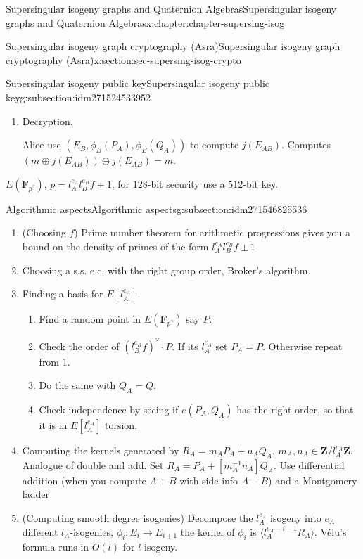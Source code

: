 \documentclass[oneside,10pt,]{book}
\numberwithin{equation}{section}
\newcommand{\inv}{^{-1}}
\newcommand{\lb}{[}
\newcommand{\rb}{]}
\newcommand{\ZZ}{\mathbf{Z}}
\newcommand{\FF}{\mathbf{F}}
\begin{document}
\begin{chapterptx}{Supersingular isogeny graphs and Quaternion Algebras}{}{Supersingular isogeny graphs and Quaternion Algebras}{}{}{x:chapter:chapter-supersing-isog}
\begin{sectionptx}{Supersingular isogeny graph cryptography (Asra)}{}{Supersingular isogeny graph cryptography (Asra)}{}{}{x:section:sec-supersing-isog-crypto}
\begin{subsectionptx}{Supersingular isogeny public key}{}{Supersingular isogeny public key}{}{}{g:subsection:idm271524533952}
\begin{enumerate}
\par
Send Alice \(c = (E_B, \phi_B(P_A), \phi_B(Q_A), m\oplus j(E_{AB}))\)%
\item{}Decryption.%
\par
Alice use \((E_B, \phi_B(P_A), \phi_B(Q_A))\) to compute \(j(E_{AB})\). Computes \((m\oplus j(E_{AB})) \oplus j(E_{AB}) = m\).%
\end{enumerate}
%
\par
\(E(\FF_{p^2})\), \(p = l_A^{e_A} l_B^{e_B} f \pm 1\), for \(128\)-bit security use a \(512\)-bit key.%
\end{subsectionptx}
%
%
\typeout{************************************************}
\typeout{************************************************}
%
\begin{subsectionptx}{Algorithmic aspects}{}{Algorithmic aspects}{}{}{g:subsection:idm271546825536}
%
\begin{enumerate}
\item{}(Choosing \(f\)) Prime number theorem for arithmetic progressions gives you a bound on the density of primes of the form \(l_A^{e_A} l_B^{e_B} f \pm 1\)%
\item{}Choosing a s.s. e.c. with the right group order, Broker's algorithm.%
\item{}Finding a basis for \(E\lb l_A^{e_A}\rb\).%
\begin{enumerate}
\item{}Find a random point in \(E(\FF_{p^2})\) say \(P\).%
\item{}Check the order of \((l_B^{e_B} f)^2 \cdot P\). If its \(l_A^{e_A}\) set \(P_A = P\). Otherwise repeat from 1.%
\item{}Do the same with \(Q_A = Q\).%
\item{}Check independence by seeing if \(e(P_A,Q_A) \) has the right order, so that it is in \(E\lb l_A^{e_A} \rb\) torsion.%
\end{enumerate}
%
\item{}Computing the kernels generated by \(R_A = m_A P_A + n_A Q_A\), \(m_A, n_A \in \ZZ/l_A^{e_A} \ZZ\). Analogue of double and add. Set \(R_A = P_A + \lb m_A\inv n_A\rb Q_A\). Use differential addition (when you compute \(A+B\) with side info \(A-B\)) and a Montgomery ladder%
\item{}(Computing smooth degree isogenies) Decompose the \(l_A^{e_A}\) isogeny into \(e_A\) different \(l_A\)-isogenies, \(\phi_i\colon E_i \to E_{i+1}\) the kernel of \(\phi_i\) is \(\langle l_A^{e_A - i - 1} R_A\rangle\). Vélu's formula runs in \(O(l)\) for \(l\)-isogeny.%

\end{enumerate}
\end{subsectionptx}
\end{sectionptx}
\end{chapterptx}
\end{document}
